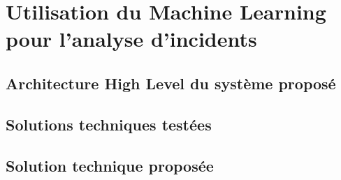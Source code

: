 \chapter{Utilisation du Machine Learning pour l'analyse d'incidents}
\label{Utilisation du Machine Learning pour l'analyse d'incidents}
\thispagestyle{fancy}


\section{Architecture High Level du système proposé}
\label{Utilisation du Machine Learning pour l'analyse d'incidents: Achitecture High Level du système proposé}

\section{Solutions techniques testées}
\label{Utilisation du Machine Learning pour l'analyse d'incidents: Solutions techniques testées}

\section{Solution technique proposée}
\label{Utilisation du Machine Learning pour l'analyse d'incidents: Solution technique proposée}

